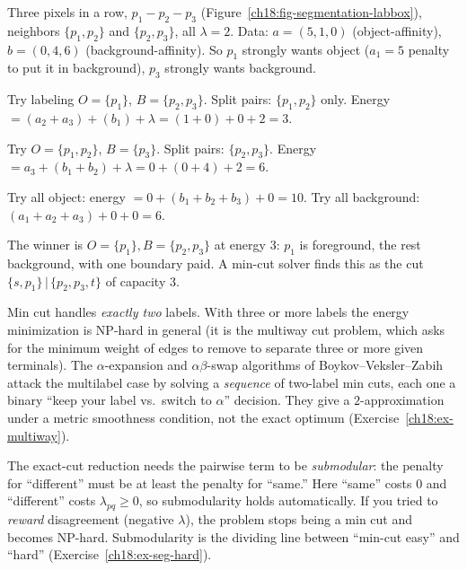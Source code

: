 \begin{labbox}
Three pixels in a row, $p_1 - p_2 - p_3$ (Figure~\ref{ch18:fig-segmentation-labbox}), neighbors $\{p_1,p_2\}$ and $\{p_2,p_3\}$, all $\lambda = 2$. Data: $a = (5, 1, 0)$ (object-affinity), $b = (0, 4, 6)$ (background-affinity). So $p_1$ strongly wants object ($a_1=5$ penalty to put it in background), $p_3$ strongly wants background.
\par
Try labeling $O=\{p_1\}$, $B=\{p_2,p_3\}$. Split pairs: $\{p_1,p_2\}$ only. Energy $= (a_2+a_3) + (b_1) + \lambda = (1+0) + 0 + 2 = 3$.
\par
Try $O=\{p_1,p_2\}$, $B=\{p_3\}$. Split pairs: $\{p_2,p_3\}$. Energy $= a_3 + (b_1+b_2) + \lambda = 0 + (0+4) + 2 = 6$.
\par
Try all object: energy $= 0 + (b_1+b_2+b_3) + 0 = 10$. Try all background: $(a_1+a_2+a_3) + 0 + 0 = 6$.
\par
The winner is $O=\{p_1\}, B=\{p_2,p_3\}$ at energy $3$: $p_1$ is foreground, the rest background, with one boundary paid. A min-cut solver finds this as the cut $\{s,p_1\}\,|\,\{p_2,p_3,t\}$ of capacity $3$.
\end{labbox}

\begin{trapbox}
Min cut handles \emph{exactly two} labels. With three or more labels the energy minimization is NP-hard in general (it is the multiway cut problem, which asks for the minimum weight of edges to remove to separate three or more given terminals). The $\alpha$-expansion and $\alpha\beta$-swap algorithms of Boykov--Veksler--Zabih attack the multilabel case by solving a \emph{sequence} of two-label min cuts, each one a binary ``keep your label vs.\ switch to $\alpha$'' decision. They give a $2$-approximation under a metric smoothness condition, not the exact optimum (Exercise~\ref{ch18:ex-multiway}).
\end{trapbox}

\begin{trapbox}
The exact-cut reduction needs the pairwise term to be \emph{submodular}: the penalty for ``different'' must be at least the penalty for ``same.'' Here ``same'' costs $0$ and ``different'' costs $\lambda_{pq}\ge 0$, so submodularity holds automatically. If you tried to \emph{reward} disagreement (negative $\lambda$), the problem stops being a min cut and becomes NP-hard. Submodularity is the dividing line between ``min-cut easy'' and ``hard'' (Exercise~\ref{ch18:ex-seg-hard}).
\end{trapbox}

